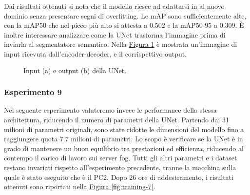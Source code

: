 \documentclass[12pt]{report}
\begin{document}
Dai risultati ottenuti si nota che il modello riesce ad adattarsi in al nuovo dominio senza presentare segni di overfitting. Le mAP sono sufficientemente alte, con la mAP50 che nel picco più alto si attesta a 0.502 e la mAP50-95 a 0.309. È inoltre interessare analizzare come la UNet trasforma l'immagine prima di inviarla al segmentatore semantico. Nella \hyperref[fig:prediciton-4]{Figura \ref{fig:prediciton-4}} è mostrata un'immagine di input ricevuta dall'encoder-decoder, e il corrispettivo output.

\begin{figure}[h!]
	\centering
	\hspace{0.01\textwidth}
	\caption{Input (a) e output (b) della UNet.}
	\label{fig:prediciton-4}
\end{figure}

\subsubsection{Esperimento 9}
\label{sec:esperimento_9}

Nel seguente esperimento valuteremo invece le performance della stessa architettura, riducendo il numero di parametri della UNet. Partendo dai 31 milioni di parametri originali, sono state ridotte le dimensioni del modello fino a raggiungere quota 7.7 milioni di parametri. Lo scopo è verificare se la UNet è in grado di mantenere un buon equilibrio tra prestazioni ed efficienza, riducendo al contempo il carico di lavoro sui server fog. Tutti gli altri parametri e i dataset restano invariati rispetto all'esperimento precedente, tranne la macchina sulla quale è stato eseguito che è il PC2. Dopo 26 ore di addestramento, i risultati ottenuti sono riportati nella \hyperref[fig:training-7]{Figura \ref{fig:training-7}}.
\end{document}
